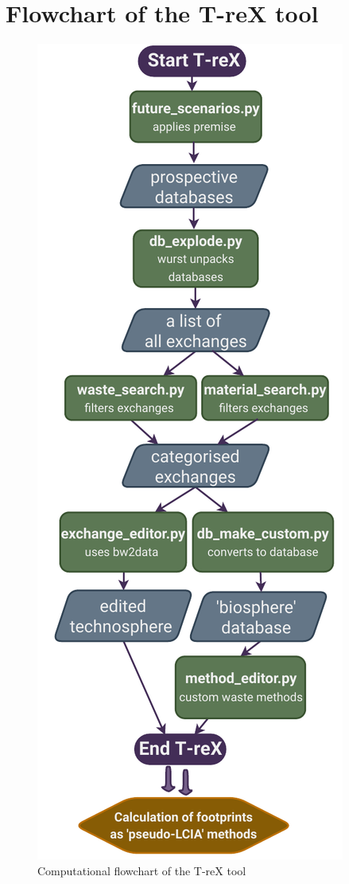 \documentclass{article}
\begin{document}
\section{Flowchart of the T-reX tool}


\begin{figure}
    \centering
    \includegraphics[height=0.8\textheight]{figures/T-reX_flowchart.pdf}
    \caption{Computational flowchart of the T-reX tool}\label{fig:flowchart}
\end{figure}
\end{document}
